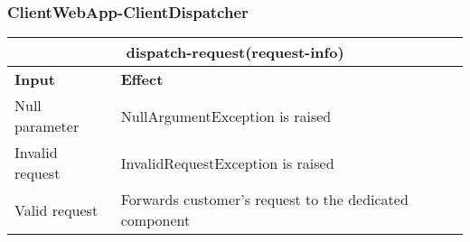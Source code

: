 \subsubsection{ClientWebApp-ClientDispatcher}
\begin{tabular}{|p{5cm}|p{7cm}|}
\hline
\multicolumn{2}{|c|}{dispatch-request(request-info)} \\
\hline
\textbf{Input} & \textbf{Effect} \\

\hline
Null parameter & NullArgumentException is raised \\

\hline
Invalid request & InvalidRequestException is raised \\

\hline
Valid request & Forwards customer’s request to the dedicated component \\
\hline
\end{tabular}